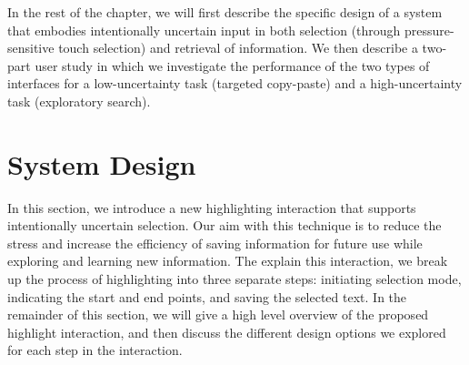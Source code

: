 In the rest of the chapter, we will first describe the specific design of a system that embodies intentionally uncertain input in both selection (through pressure-sensitive touch selection) and retrieval of information. We then describe a two-part user study in which we investigate the performance of the two types of interfaces for a low-uncertainty task (targeted copy-paste) and a high-uncertainty task (exploratory search). 












\section{System Design}
In this section, we introduce a new highlighting interaction that supports intentionally uncertain selection. Our aim with this technique is to reduce the stress and increase the efficiency of saving information for future use while exploring and learning new information. The explain this interaction, we break up the process of highlighting into three separate steps: initiating selection mode, indicating the start and end points, and saving the selected text. In the remainder of this section, we will give a high level overview of the proposed highlight interaction, and then discuss the different design options we explored for each step in the interaction.

